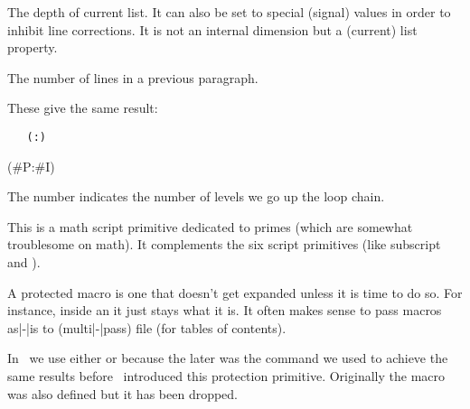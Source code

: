 \stopoldprimitive

\startoldprimitive[title={\prm {prevdepth}}]

The depth of current list. It can also be set to special (signal) values in order
to inhibit line corrections. It is not an internal dimension but a (current) list
property.

\stopoldprimitive

\startoldprimitive[title={\prm {prevgraf}}]

The number of lines in a previous paragraph.

\stopoldprimitive

\startnewprimitive[title={\prm {previousloopiterator}}]

\startbuffer
\edef\testA{
    \expandedrepeat 2 {%
        \expandedrepeat 3 {%
            (\the\previousloopiterator1:\the\currentloopiterator)
        }%
    }%
}
\edef\testB{
    \expandedrepeat 2 {%
        \expandedrepeat 3 {%
            (#P:#I) %
        }%
    }%
}
\stopbuffer

\typebuffer \getbuffer

These give the same result:

\startlines \tt
\meaningasis\testA
\meaningasis\testB
\stoplines

The number indicates the number of levels we go up the loop chain.

\stopnewprimitive

\startnewprimitive[title={\prm {primescript}}]

This is a math script primitive dedicated to primes (which are somewhat
troublesome on math). It complements the six script primitives (like \prm
{subscript} and ).

\stopnewprimitive

\startoldprimitive[title={\prm {protected}}]

A protected macro is one that doesn't get expanded unless it is time to do so.
For instance, inside an  it just stays what it is. It often makes
sense to pass macros as|-|is to (multi|-|pass) file (for tables of contents).

In \CONTEXT\ we use either  or  because the
later was the command we used to achieve the same results before \ETEX\
introduced this protection primitive. Originally the  macro was
also defined but it has been dropped.

\stopoldprimitive


